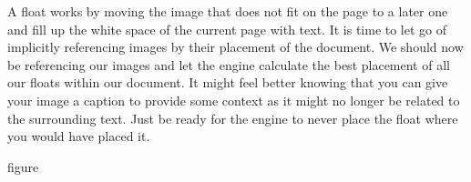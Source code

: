 A float works by moving the image that does not fit on the page to a later one
and fill up the white space of the current page with text.  It is time to 
let go of implicitly referencing images by their placement of the document. 
We should now be referencing our images and let the engine calculate the best placement
of all our floats within our document.  It might feel better knowing that 
you can give your image a caption to provide some context as it might no 
longer be related to the surrounding text.  Just be ready for the engine to
never place the float where you would have placed it.

\begin{docEnvironment*}[doclang/environment content=includegraphics here]{figure}{}{}
\end{docEnvironment*}

